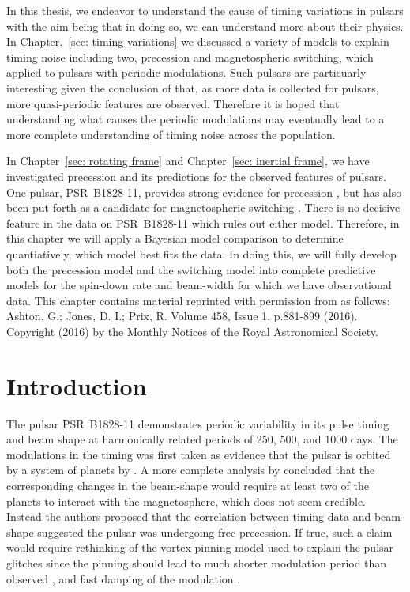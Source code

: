 \documentclass[../full_thesis/full_thesis.tex]{subfiles}
\newcommand{\thisdir}{../comparing_periodic_modulations}
\begin{document}


In this thesis, we endeavor to understand the cause of timing variations in pulsars
with the aim being that in doing so, we can understand more about their physics.
In Chapter.~\ref{sec: timing variations} we discussed a variety of models to
explain timing noise including two, precession and magnetospheric switching,
which applied to pulsars with periodic modulations. Such pulsars are particuarly
interesting given the conclusion of \citet{Hobbs2010} that, as more data is
collected for pulsars, more quasi-periodic features are observed. Therefore it
is hoped that understanding what causes the periodic modulations may eventually
lead to a more complete understanding of timing noise across the population.

In Chapter~\ref{sec: rotating frame} and Chapter~\ref{sec: inertial frame}, we
have investigated precession and its predictions for the observed features of
pulsars. One pulsar, PSR~B1828-11, provides strong evidence for precession
\citep{Stairs2000}, but has also been put forth as a candidate for
magnetospheric switching \citep{Lyne2010}. There is no decisive feature in the
data on PSR~B1828-11 which rules out either model. Therefore, in this chapter
we will apply a Bayesian model comparison to determine quantiatively, which
model best fits the data. In doing this, we will fully develop both the
precession model and the switching model into complete predictive models for
the spin-down rate and beam-width for which we have observational data.  This
chapter contains material reprinted with permission from \citet{Ashton2016} as
follows: Ashton, G.; Jones, D. I.; Prix, R. Volume 458, Issue 1, p.881-899
(2016).  Copyright (2016) by the Monthly Notices of the Royal Astronomical
Society.

\section{Introduction}
\label{sec: introduction}

The pulsar PSR~B1828-11 demonstrates periodic variability in its pulse timing and
beam shape at harmonically related periods of 250, 500, and 1000 days. The
modulations in the timing was first taken as evidence that the pulsar is
orbited by a system of planets by \citet{Bailes1993}. A more complete analysis
by \citet{Stairs2000} concluded that the corresponding changes in the
beam-shape would require at least two of the planets to interact with the
magnetosphere, which does not seem credible. Instead the authors proposed that
the correlation between timing data and beam-shape suggested the pulsar was
undergoing free precession. If true, such a claim would require rethinking of
the vortex-pinning model used to explain the pulsar glitches since the pinning
should lead to much shorter modulation period than observed \citep{Shaham1977},
and fast damping of the modulation \citep{Link2003}.
\end{document}
